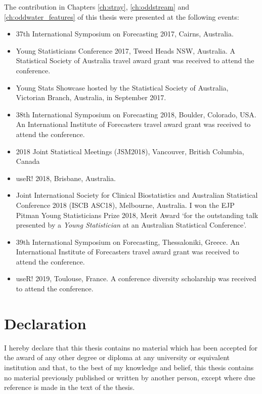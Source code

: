 \documentclass{monashthesis}
\theoremstyle{definition}
\theoremstyle{definition}
\theoremstyle{definition}
\theoremstyle{remark}
\begin{document}
The contribution in Chapters \ref{ch:stray}, \ref{ch:oddstream} and \ref{ch:oddwater_features} of this thesis were presented at the following events:

\begin{itemize}
\tightlist
\item
  37th International Symposium on Forecasting 2017, Cairns, Australia.
\item
  Young Statisticians Conference 2017, Tweed Heads NSW, Australia. \newline A Statistical Society of Australia travel award grant was received to attend the conference.
\item
  Young Stats Showcase hosted by the Statistical Society of Australia, Victorian Branch, Australia, in September 2017.
\item
  38th International Symposium on Forecasting 2018, Boulder, Colorado, USA. \newline
  An International Institute of Forecasters travel award grant was received to attend the conference.
\item
  2018 Joint Statistical Meetings (JSM2018), Vancouver, British Columbia, Canada
\item
  useR! 2018, Brisbane, Australia.
\item
  Joint International Society for Clinical Biostatistics and Australian Statistical Conference 2018 (ISCB ASC18), Melbourne, Australia. \newline I won the EJP Pitman Young Statisticians Prize 2018, Merit Award `for the outstanding talk presented by a \emph{Young Statistician} at an Australian Statistical Conference'.
\item
  39th International Symposium on Forecasting, Thessaloniki, Greece. \newline An International Institute of Forecasters travel award grant was received to attend the conference.
\item
  useR! 2019, Toulouse, France.
  \newline A conference diversity scholarship was received to attend the conference.
\end{itemize}

\hypertarget{declaration}{%
\chapter*{Declaration}\label{declaration}}

I hereby declare that this thesis contains no material which has been accepted for the award of any other degree or diploma at any university or equivalent institution and that, to the best of my knowledge and belief, this thesis contains no material previously published or written by another person, except where due reference is made in the text of the thesis.
\end{document}
